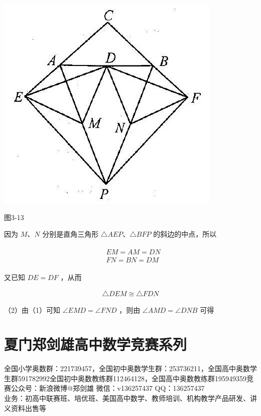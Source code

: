 \documentclass[10pt]{article}
\begin{document}
\begin{center}
\includegraphics[max width=\textwidth]{2024_10_30_2c8f45efd4a519b08e1ag-030(1)}
\end{center}

图3-13

因为 $M 、 N$ 分别是直角三角形 $\triangle A E P 、 \triangle B F P$ 的斜边的中点，所以

\begin{align*}
\begin{aligned}
& E M=A M=D N \\
& F N=B N=D M
\end{aligned}
\end{align*}

又已知 $D E=D F$ ，从而

\begin{align*}
\triangle D E M \cong \triangle F D N
\end{align*}

（2）由（1）可知 $\angle E M D=\angle F N D$ ，则由 $\angle A M D=\angle D N B$ 可得

\section*{夏门郑剑雄高中数学竞赛系列}
全国小学奥数群：221739457，全国初中奥数学生群：253736211，全国高中奥数学生群591782992全国初中奥数教练群112464128，全国高中奥数教练群195949359竞赛公众号：新浪微博@郑剑雄 微信：v136257437 QQ：136257437\\
业务：初高中联赛班、培优班、美国高中数学、教师培训、机构教学产品研发、讲义资料出售等
\end{document}
